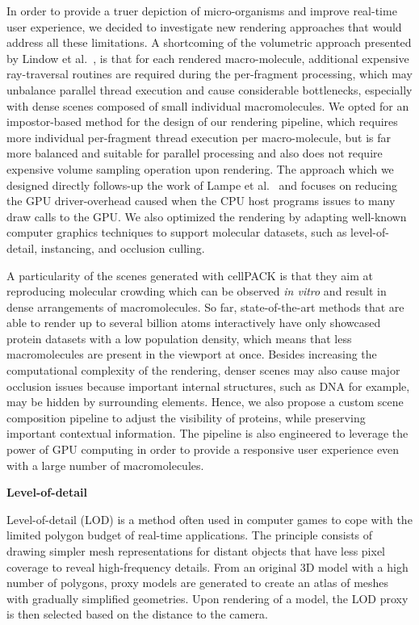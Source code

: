 In order to provide a truer depiction of micro-organisms and improve real-time user experience, we decided to investigate new rendering approaches that would address all these limitations.
A shortcoming of the volumetric approach presented by Lindow et al.~\cite{lindow2012interactive}, is that for each rendered macro-molecule, additional expensive ray-traversal routines are required during the per-fragment processing, which may unbalance parallel thread execution and cause considerable bottlenecks, especially with dense scenes composed of small individual macromolecules.
We opted for an impostor-based method for the design of our rendering pipeline, which requires more individual per-fragment thread execution per macro-molecule, but is far more balanced and suitable for parallel processing and also does not require expensive volume sampling operation upon rendering. 
The approach which we designed directly follows-up the work of Lampe et al.~\cite{lampe2007two} and focuses on reducing the GPU driver-overhead caused when the CPU host programs issues to many draw calls to the GPU.
We also optimized the rendering by adapting well-known computer graphics techniques to support molecular datasets, such as level-of-detail, instancing, and occlusion culling. 

A particularity of the scenes generated with cellPACK is that they aim at reproducing molecular crowding which can be observed \textit{in vitro} and result in dense arrangements of macromolecules.
So far, state-of-the-art methods that are able to render up to several billion atoms interactively have only showcased protein datasets with a low population density, which means that less macromolecules are present in the viewport at once.
Besides increasing the computational complexity of the rendering, denser scenes may also cause major occlusion issues because important internal structures, such as DNA for example, may be hidden by surrounding elements.
Hence, we also propose a custom scene composition pipeline to adjust the visibility of proteins, while preserving important contextual information.
The pipeline is also engineered to leverage the power of GPU computing in order to provide a responsive user experience even with a large number of macromolecules.


\textbf{Level-of-detail}

Level-of-detail (LOD) is a method often used in computer games to cope with the limited polygon budget of real-time applications.
The principle consists of drawing simpler mesh representations for distant objects that have less pixel coverage to reveal high-frequency details. 
From an original 3D model with a high number of polygons, proxy models are generated to create an atlas of meshes with gradually simplified geometries.
Upon rendering of a model, the LOD proxy is then selected based on the distance to the camera.

